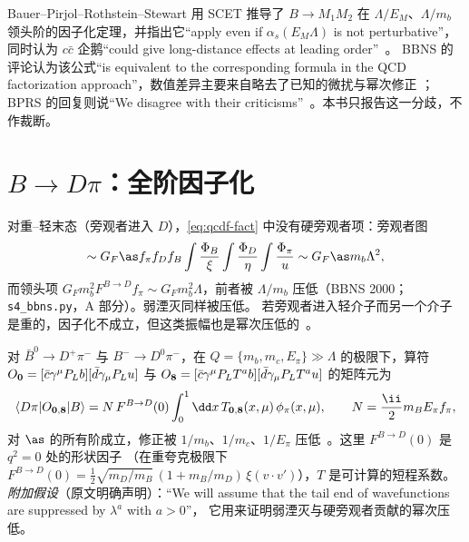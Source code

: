 \begin{remark}\label{rem:qcdf-dispute}
Bauer--Pirjol--Rothstein--Stewart 用 SCET 推导了 $B\to M_1M_2$ 在 $\Lambda/E_M$、$\Lambda/m_b$ 领头阶的因子化定理，并指出它“apply even if
$\alpha_s(E_M\Lambda)$ is not perturbative”，同时认为 $c\bar c$ 企鹅“could give long-distance effects at leading order”~\cite{BauerEtAl2004b}。
BBNS 的评论认为该公式“is equivalent to the corresponding formula in the QCD factorization approach”，数值差异主要来自略去了已知的微扰与幂次修正
\cite{BenekeEtAl2005}；BPRS 的回复则说“We disagree with their criticisms”~\cite{BauerEtAl2005}。本书只报告这一分歧，不作裁断。
\end{remark}

\section{\texorpdfstring{$B\to D\pi$}{B -> D pi}：全阶因子化}\label{sec:b-dpi}

对重–轻末态（旁观者进入 $D$），\cref{eq:qcdf-fact} 中没有硬旁观者项：旁观者图
\[
\sim G_F\as f_\pi f_Df_B\int\frac{\Phi_B}{\xi}\int\frac{\Phi_D}{\eta}\int\frac{\Phi_\pi}{u}\sim G_F\as m_b\Lambda^2,
\]
而领头项 $G_Fm_b^2F^{B\to D}f_\pi\sim G_Fm_b^2\Lambda$，前者被 $\Lambda/m_b$ 压低（BBNS 2000；\texttt{s4\_\allowbreak bbns.py}，A 部分）。弱湮灭同样被压低。
若旁观者进入轻介子而另一个介子是重的，因子化不成立，但这类振幅也是幂次压低的~\cite{BenekeEtAl2000}。

\begin{theorem}\tagA\label{thm:b-dpi}
对 $\bar B^0\to D^+\pi^-$ 与 $B^-\to D^0\pi^-$，在 $Q=\{m_b,m_c,E_\pi\}\gg\Lambda$ 的极限下，算符
$O_{\bf0}=[\bar c\gamma^\mu P_Lb][\bar d\gamma_\mu P_Lu]$ 与 $O_{\bf8}=[\bar c\gamma^\mu P_LT^ab][\bar d\gamma_\mu P_LT^au]$ 的矩阵元为
\begin{equation}\label{eq:bdpi-fact}
\langle D\pi|O_{{\bf0},{\bf8}}|B\rangle=N\,F^{B\to D}(0)\int_0^1\dd x\,T_{{\bf0},{\bf8}}(x,\mu)\,\phi_\pi(x,\mu),\qquad N=\frac{\ii}{2}m_BE_\pi f_\pi,
\end{equation}
对 $\as$ 的所有阶成立，修正被 $1/m_b$、$1/m_c$、$1/E_\pi$ 压低~\cite{BauerPirjolStewart2001}。这里 $F^{B\to D}(0)$ 是 $q^2=0$ 处的形状因子
（在重夸克极限下 $F^{B\to D}(0)=\frac12\sqrt{m_D/m_B}\,(1+m_B/m_D)\,\xi(v\cdot v')$），$T$ 是可计算的短程系数。
\emph{附加假设}（原文明确声明）：“We will assume that the tail end of wavefunctions are suppressed by $\lambda^a$ with $a>0$”，
它用来证明弱湮灭与硬旁观者贡献的幂次压低。
\end{theorem}

